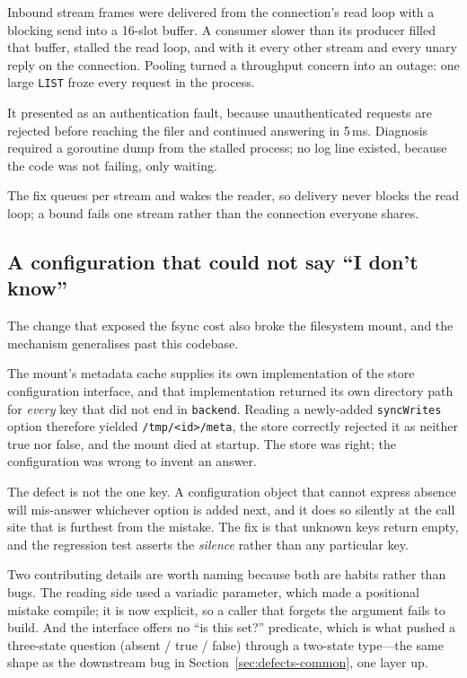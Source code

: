 \documentclass[11pt]{article}
\begin{document}
Inbound stream frames were delivered from the connection's read loop with a
blocking send into a 16-slot buffer. A consumer slower than its producer
filled that buffer, stalled the read loop, and with it every other stream and
every unary reply on the connection. Pooling turned a throughput concern into
an outage: one large \texttt{LIST} froze every request in the process.

It presented as an authentication fault, because unauthenticated requests are
rejected before reaching the filer and continued answering in
5\,ms. Diagnosis required a goroutine dump from the stalled process; no
log line existed, because the code was not failing, only waiting.

The fix queues per stream and wakes the reader, so delivery never blocks the
read loop; a bound fails one stream rather than the connection everyone
shares.

\subsection{A configuration that could not say ``I don't know''}

The change that exposed the fsync cost also broke the filesystem mount, and
the mechanism generalises past this codebase.

The mount's metadata cache supplies its own implementation of the store
configuration interface, and that implementation returned its own directory
path for \emph{every} key that did not end in \texttt{backend}. Reading a
newly-added \texttt{syncWrites} option therefore yielded
\texttt{/tmp/<id>/meta}, the store correctly rejected it as neither true nor
false, and the mount died at startup. The store was right; the configuration
was wrong to invent an answer.

The defect is not the one key. A configuration object that cannot express
absence will mis-answer whichever option is added next, and it does so
silently at the call site that is furthest from the mistake. The fix is that
unknown keys return empty, and the regression test asserts the \emph{silence}
rather than any particular key.

Two contributing details are worth naming because both are habits rather than
bugs. The reading side used a variadic parameter, which made a positional
mistake compile; it is now explicit, so a caller that forgets the argument
fails to build. And the interface offers no ``is this set?'' predicate, which
is what pushed a three-state question (absent / true / false) through a
two-state type---the same shape as the downstream bug in
Section~\ref{sec:defects-common}, one layer up.
\end{document}
